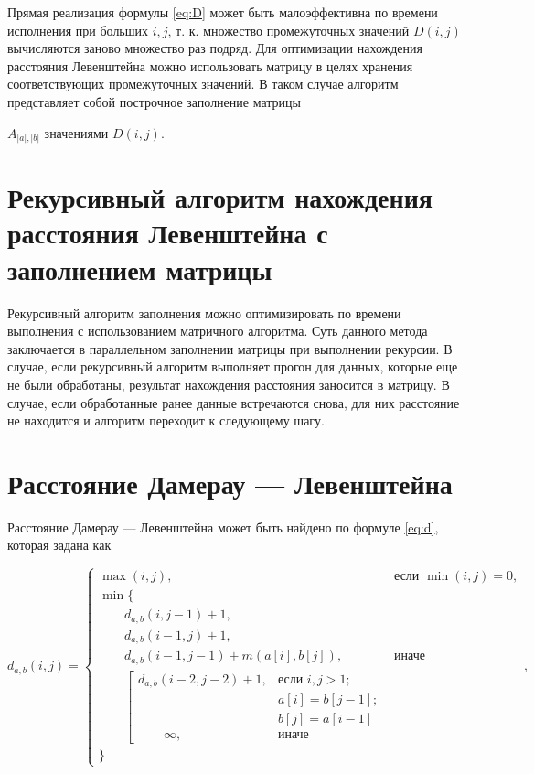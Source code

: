 Прямая реализация формулы \eqref{eq:D} может быть малоэффективна по времени исполнения при больших $i, j$,
т. к. множество промежуточных значений $D(i, j)$ вычисляются заново множество раз подряд.
Для оптимизации нахождения расстояния Левенштейна можно использовать матрицу в целях хранения соответствующих промежуточных значений.
В таком случае алгоритм представляет собой построчное заполнение матрицы

$A_{|a|,|b|}$ значениями $D(i, j)$.

\section{Рекурсивный алгоритм нахождения расстояния Левенштейна с заполнением матрицы}

\label{sec:recmat}

Рекурсивный алгоритм заполнения можно оптимизировать по времени выполнения с использованием матричного алгоритма.
Суть данного метода заключается в параллельном заполнении матрицы при выполнении рекурсии.
В случае, если рекурсивный алгоритм выполняет прогон для данных, которые еще не были обработаны,
результат нахождения расстояния заносится в матрицу.
В случае, если обработанные ранее данные встречаются снова, для них расстояние не находится и алгоритм переходит к следующему шагу.

\section{Расстояние Дамерау — Левенштейна}

Расстояние Дамерау — Левенштейна может быть найдено по формуле \eqref{eq:d}, которая задана как

\begin{equation}
    \label{eq:d}
    d_{a,b}(i, j) = \begin{cases}
                        \max(i, j), &\text{если }\min(i, j) = 0,\\
                        \min \lbrace \\
                        \qquad d_{a,b}(i, j-1) + 1,\\
                        \qquad d_{a,b}(i-1, j) + 1,\\
                        \qquad d_{a,b}(i-1, j-1) + m(a[i], b[j]), &\text{иначе}\\
                        \qquad \left[ \begin{array}{cc}d_{a,b}(i-2, j-2) + 1, &\text{если }i,j > 1;\\
                        \qquad &\text{}a[i] = b[j-1]; \\
                        \qquad &\text{}b[j] = a[i-1]\\
                        \qquad \infty, & \text{иначе}\end{array}\right.\\
                        \rbrace
    \end{cases},
\end{equation}

